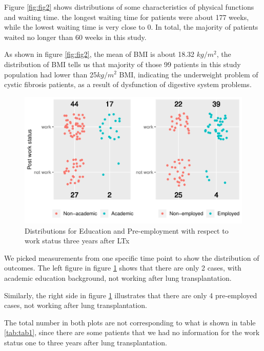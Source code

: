 \documentclass[11pt, a4paper]{article}\usepackage[]{graphicx}\usepackage[]{color}
\makeatletter
\def\maxwidth{ %
  \ifdim\Gin@nat@width>\linewidth
    \linewidth
  \else
    \Gin@nat@width
  \fi
}
\newenvironment{knitrout}{}{} %
\makeatother
\begin{document}
Figure \ref{fig:fig2} shows distributions of some characteristics of physical functions and waiting time. the longest waiting time for patients were about 177 weeks, while the lowest waiting time is very close to 0. In total, the majority of patients waited no longer than 60 weeks in this study.

As shown in figure \ref{fig:fig2}, the mean of BMI is about 18.32 $kg/m^2$, the distribution of BMI tells us that majority of those 99 patients in this study population had lower than 25$kg/m^2$ BMI, indicating the underweight problem of cystic fibrosis patients, as a result of dysfunction of digestive system problems.
\clearpage


\begin{figure}[!ht]
\centering
\begin{knitrout}
\color{fgcolor}
\includegraphics[width=\maxwidth]{plots/passos_educationplot-1} 

\end{knitrout}
\caption{Distributions for Education and Pre-employment with respect to work status three years after LTx}\label{fig:fig3}
\end{figure}



We picked measurements from one specific time point to show the distribution of outcomes. The left figure in figure \ref{fig:fig3} shows that there are only 2 cases, with academic education background, not working after lung transplantation.  

Similarly, the right side in figure \ref{fig:fig3} illustrates that there are only 4 pre-employed cases, not working after lung transplantation.

The total number in both plots are not corresponding to what is shown in table \ref{tab:tab1}, since there are some patients that we had no information for the work status one to three years after lung transplantation.
\end{document}
